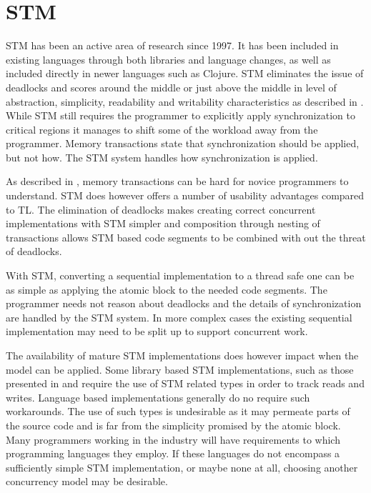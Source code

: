 \section{\acl{STM}}\label{sec:choose_STM}
\ac{STM} has been an active area of research since 1997\cite{shavit1997software}. It has been included in existing languages through both libraries\cite{rossbach2010transactional} and language changes\cite{harris2003language}, as well as included directly in newer languages such as Clojure. \ac{STM} eliminates the issue of deadlocks and scores around the middle or just above the middle in level of abstraction, simplicity, readability and writability characteristics as described in . While \ac{STM} still requires the programmer to explicitly apply synchronization to critical regions it manages to shift some of the workload away from the programmer. Memory transactions state that synchronization should be applied, but not how. The \ac{STM} system handles how synchronization is applied.

As described in , memory transactions can be hard for novice programmers to understand. \ac{STM} does however offers a number of usability advantages compared to \ac{TL}. The elimination of deadlocks makes creating correct concurrent implementations with \ac{STM} simpler and composition through nesting of transactions allows \ac{STM} based code segments to be combined with out the threat of deadlocks.

With \ac{STM}, converting a sequential implementation to a thread safe one can be as simple as applying the atomic block to the needed code segments. The programmer needs not reason about deadlocks and the details of synchronization are handled by the \ac{STM} system. In more complex cases the existing sequential implementation may need to be split up to support concurrent work.

The availability of mature \ac{STM} implementations does however impact when the model can be applied. Some library based \ac{STM} implementations, such as those presented in \cite{ramadan2009committing} and \cite{herlihy2006flexible} require the use of \ac{STM} related types in order to track reads and writes. Language based implementations generally do no require such workarounds. The use of such types is undesirable as it may permeate parts of the source code and is far from the simplicity promised by the atomic block. Many programmers working in the industry will have requirements to which programming languages they employ. If these languages do not encompass a sufficiently simple \ac{STM} implementation, or maybe none at all, choosing another concurrency model may be desirable. 

